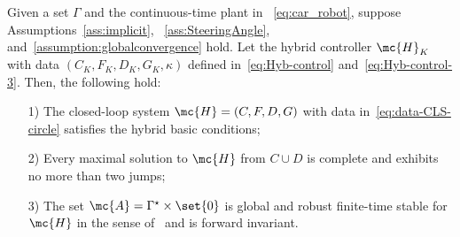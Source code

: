 \begin{theorem}
\label{theo:geometric-hybrid-cricle}
Given a set $\Gamma$ and the continuous-time plant in ~\eqref{eq:car_robot}, suppose Assumptions~\ref{ass:implicit}, ~\ref{ass:SteeringAngle}, and~\ref{assumption:globalconvergence} hold. Let the hybrid controller $\mc{H}_K$ with data $(C_K,F_K,D_K,G_K,\kappa)$ defined in~\eqref{eq:Hyb-control} and~\eqref{eq:Hyb-control-3}. Then, the following hold:

\begin{enumerate}
    \item [{1)}] The closed-loop system $\mc{H} = (C,F,D,G)$ with data in~\eqref{eq:data-CLS-circle} satisfies the hybrid basic conditions\cite[Definition 2.18]{San2021};
    \item [{2)}]Every maximal solution to $\mc{H}$ from $C \cup D$ is complete and exhibits no more than two jumps; 
    \item [{3)}]The set 
$
    \mc{A} = \Gamma^\star \times \set{0}
$
    is global and robust finite-time stable for $\mc{H}$ in the sense of~\cite[Definition 3.16]{San2021} and is forward invariant.
\end{enumerate}

\end{theorem}
